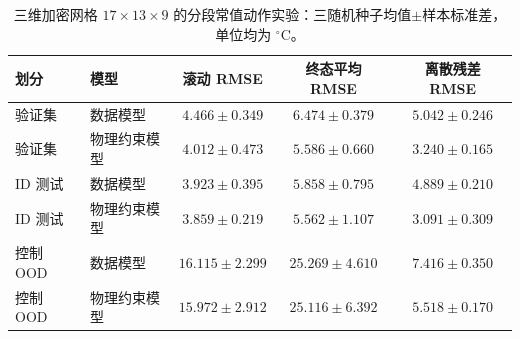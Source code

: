 \begin{table}[htbp]
\centering
\small
\setlength{\tabcolsep}{4pt}
\caption{三维加密网格 $17\times13\times9$ 的分段常值动作实验：三随机种子均值$\pm$样本标准差，单位均为 $^\circ\mathrm{C}$。}
\label{tab:three-dimensional-zoh-refined}
\begin{tabular}{llccc}
\toprule
划分 & 模型 & 滚动 RMSE & 终态平均 RMSE & 离散残差 RMSE \\
\midrule
验证集 & 数据模型 & $4.466\pm0.349$ & $6.474\pm0.379$ & $5.042\pm0.246$ \\
验证集 & 物理约束模型 & $4.012\pm0.473$ & $5.586\pm0.660$ & $3.240\pm0.165$ \\
ID 测试 & 数据模型 & $3.923\pm0.395$ & $5.858\pm0.795$ & $4.889\pm0.210$ \\
ID 测试 & 物理约束模型 & $3.859\pm0.219$ & $5.562\pm1.107$ & $3.091\pm0.309$ \\
控制 OOD & 数据模型 & $16.115\pm2.299$ & $25.269\pm4.610$ & $7.416\pm0.350$ \\
控制 OOD & 物理约束模型 & $15.972\pm2.912$ & $25.116\pm6.392$ & $5.518\pm0.170$ \\
\bottomrule
\end{tabular}
\end{table}
